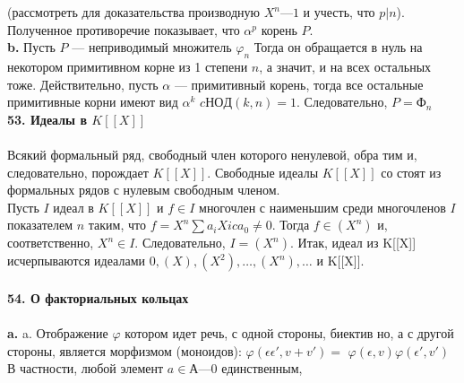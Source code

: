 \documentclass{mai_book}
\begin{document}
\noindent (рассмотреть для доказательства производную $X^{n} — 1$ и учесть, \linebreak
что $p|n$). Полученное противоречие показывает, что $\alpha^{p}$ корень $P$.\\
\hspace*{15pt}\textbf{b.} Пусть $P$ — неприводимый множитель $\varphi_n$ Тогда он обращается\linebreak
в нуль на некотором примитивном корне из 1 степени $n$, а значит, и на\linebreak
всех остальных тоже. Действительно, пусть $\alpha$ — примитивный корень,\linebreak
тогда все остальные примитивные корни имеют вид $\alpha^{k}$ $c НОД(k, n) = 1$.\linebreak
Следовательно, $P = \text{Ф}_n$\newline
\\
\noindent\textbf{53. Идеалы в $K[[X]]$}\\
\\
\hspace*{15pt} Всякий формальный ряд, свободный член которого ненулевой, обра­\linebreak
тим и, следовательно, порождает $K[[X]]$. Свободные идеалы $K[[X]]$ со­\linebreak
стоят из формальных рядов с нулевым свободным членом.\\
\hspace*{0pt} Пусть $I$ идеал в $K[[X]]$ и $f \in I$ многочлен с наименьшим среди\linebreak
многочленов $I$ показателем $n$ таким, что $f = X^{n}\sum a_{i}X{i} c a_0 \neq 0$. Тогда\linebreak
$f \in (X^{n})$ и, соответственно, $X^{n} \in I$. Следовательно, $I = (X^{n}).$ Итак,\linebreak
идеал из K[[X]] исчерпываются идеалами ${0}, (X), (X^{2}),\ldots, (X^{n} ), \ldots$ и\linebreak
K[[X]].\\
\\
\noindent\textbf{54. О факториальных кольцах}\\
\\
\hspace*{15pt}\textbf{a.} a. Отображение $\varphi$ котором идет речь, с одной стороны, биектив­\linebreak
но, а с другой стороны, является морфизмом (моноидов): $\varphi(\epsilon\epsilon',v + v') =$\linebreak
$\varphi(\epsilon,v)\varphi(\epsilon', v')$ В частности, любой элемент $a \in А — {0}$ единственным,\linebreak
\end{document}
